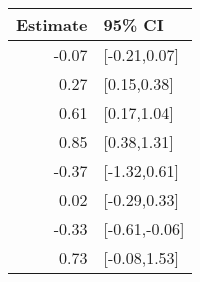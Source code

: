 \begin{tabular}{rl}
  \hline
Estimate & 95\% CI \\ 
  \hline
-0.07 & [-0.21,0.07] \\ 
  0.27 & [0.15,0.38] \\ 
  0.61 & [0.17,1.04] \\ 
  0.85 & [0.38,1.31] \\ 
  -0.37 & [-1.32,0.61] \\ 
  0.02 & [-0.29,0.33] \\ 
  -0.33 & [-0.61,-0.06] \\ 
  0.73 & [-0.08,1.53] \\ 
   \hline
\end{tabular}

